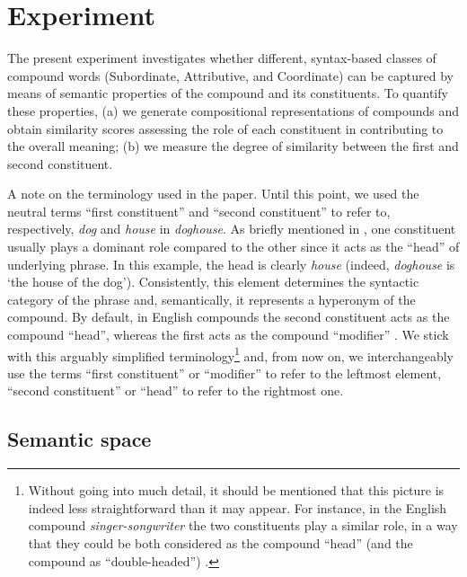 \documentclass[output=paper]{langsci/langscibook}
\begin{document}

\section{Experiment}
\label{sec:experiments}

The present experiment investigates whether different, syntax-based classes of compound words (Subordinate, Attributive, and Coordinate) can be captured by means of semantic properties of the compound and its constituents. To quantify these properties, (a) we generate compositional representations of compounds and obtain similarity scores assessing the role of each constituent in contributing to the overall meaning; (b) we measure the degree of similarity between the first and second constituent.

A note on the terminology used in the paper. Until this point, we used the neutral terms ``first constituent'' and ``second constituent'' to refer to, respectively, \emph{dog} and \emph{house} in \emph{doghouse}. As briefly mentioned in , one constituent usually plays a dominant role compared to the other since it acts as the ``head'' of underlying phrase. In this example, the head is clearly \emph{house} (indeed, \emph{doghouse} is `the house of the dog'). Consistently, this element determines the syntactic category of the phrase and, semantically, it represents a hyperonym of the compound. By default, in English compounds the second constituent acts as the compound ``head'', whereas the first acts as the compound ``modifier'' \citep{bauerOHC}. We stick with this arguably simplified terminology\footnote{Without going into much detail, it should be mentioned that this picture is indeed less straightforward than it may appear. For instance, in the English compound \emph{singer-songwriter} the two constituents play a similar role, in a way that they could be both considered as the compound ``head'' (and the compound as ``double-headed'') \citep{bauerOHC}.} and, from now on, we interchangeably use the terms ``first constituent'' or ``modifier'' to refer to the leftmost element, ``second constituent'' or ``head'' to refer to the rightmost one.


\subsection{Semantic space}\label{sec:vectors}
\end{document}
